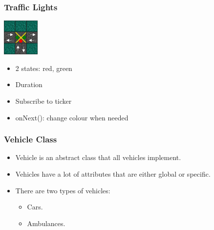 \documentclass{beamer}
\begin{document}
	 \begin{frame}
      	  \frametitle{Traffic Lights}
		\includegraphics[scale=1, center]{trafficLight}
      	    \begin{itemize}
      	    \item 2 states: red, green
      	    \item Duration
	    \item Subscribe to ticker
	    \item onNext(): change colour when needed
      	    \end{itemize}
      	  \end{frame}

\begin{frame}
\frametitle{Vehicle Class}
\begin{itemize}
\item Vehicle is an abstract class that all vehicles implement.
\item Vehicles have a lot of attributes that are either global or specific.
\item There are two types of vehicles: 
\begin{itemize}
\item Cars.
\item Ambulances.
\end{itemize}

\end{itemize}

\end{frame}
	  
\end{document}
